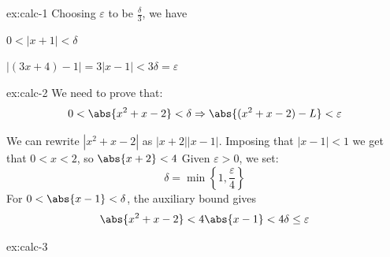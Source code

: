 
\begin{solution}{ex:calc-1}
  Choosing $\varepsilon$ to be $\frac{\delta}{3}$, 
  we have

  $0 < \vert x+1\vert < \delta $

  $\vert (3x+4) - 1 \vert = 3\vert x-1 \vert < 3\delta = \varepsilon$

\end{solution}

\begin{solution}{ex:calc-2}
  We need to prove that:
  \[
    0 < \abs{x^2+x-2} < \delta \Rightarrow \abs{(x^2+x-2)-L}<\varepsilon
  \]

  We can rewrite $|x^2+x-2|$ as $|x+2||x-1|$.  Imposing that $|x-1|<1$ we get that $0<x<2$, so $\abs{x+2}<4$
  Given $\varepsilon>0$, we set: 
  \[
    \delta = \min\left\{1, \frac{\varepsilon}{4}\right\}
    \]
  For $0<\abs{x-1}<\delta$, the auxiliary bound gives
  \[
    \abs{x^2+x-2}<4\abs{x-1}<4\delta \leq \varepsilon
  \]
\end{solution}
\begin{solution}{ex:calc-3}


\end{solution}
